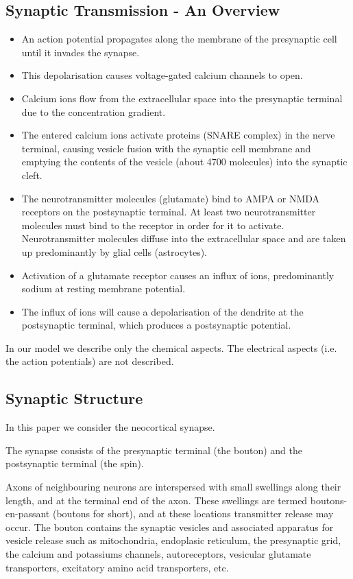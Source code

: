 \documentclass[a4paper]{article}
\begin{document}
\subsection{Synaptic Transmission - An Overview}
\begin{itemize}
    \item An action potential propagates along the membrane of the presynaptic cell until it invades the synapse.
    \item This depolarisation causes voltage-gated calcium channels to open.
    \item Calcium ions flow from the extracellular space into the presynaptic terminal due to the concentration gradient.
    \item The entered calcium ions activate proteins (SNARE complex) in the nerve terminal, causing vesicle fusion with the synaptic cell membrane and emptying the contents of the vesicle (about 4700 molecules) into the synaptic cleft.
    \item The neurotransmitter molecules (glutamate) bind to AMPA or NMDA receptors on the postsynaptic terminal. At least two neurotransmitter molecules  must bind to the receptor in order for it to activate. Neurotransmitter molecules diffuse into the extracellular space and are taken up predominantly by glial cells (astrocytes). 
    \item Activation of a glutamate receptor causes an influx of ions, predominantly sodium at resting membrane potential. 
    \item The influx of ions will cause a depolarisation of the dendrite at the postsynaptic terminal, which produces a postsynaptic potential.

\end{itemize}

In our model we describe only the chemical aspects. The electrical aspects (i.e. the action potentials) are not described.

\subsection{Synaptic Structure}
In this paper we consider the neocortical synapse.

The synapse consists of the presynaptic terminal (the bouton) and the postsynaptic terminal (the spin). 

Axons of neighbouring neurons are interspersed with small swellings along their length, and at the terminal end of the axon. These swellings are termed boutons-en-passant (boutons for short), and at these locations transmitter release may occur. The bouton contains the synaptic vesicles and associated apparatus for vesicle release such as mitochondria, endoplasic reticulum, the presynaptic grid, the calcium and potassiums channels, autoreceptors, vesicular glutamate transporters, excitatory amino acid transporters, etc.
\end{document}
